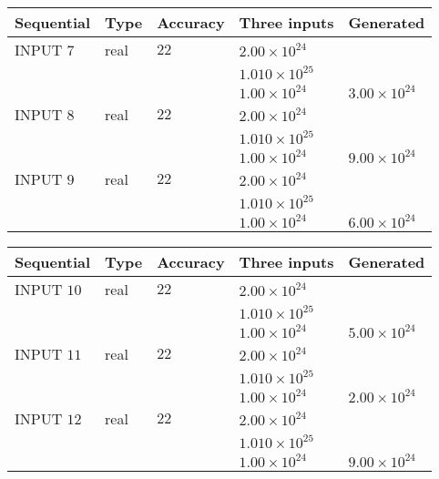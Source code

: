 \documentclass[12pt]{article}
\begin{document}
   
  
  
\noindent\begin{tabular}{|l|l|l|l|l|}
\hline
 Sequential & Type & Accuracy & Three inputs & Generated \\ 
\hline
 
 
  INPUT $            7 $ & real & $           22  $ & $
 2.00 \times 10^{24}
  $ & \\
  & & &  $
 1.010 \times 10^{25}
  $ & \\
  & & &  $
 1.00 \times 10^{24}
 $ & $ 3.00 \times 10^{24} $ 
 \\  \hline  
 
 
  INPUT $            8 $ & real & $           22  $ & $
 2.00 \times 10^{24}
  $ & \\
  & & &  $
 1.010 \times 10^{25}
  $ & \\
  & & &  $
 1.00 \times 10^{24}
 $ & $ 9.00 \times 10^{24} $ 
 \\  \hline  
 
 
  INPUT $            9 $ & real & $           22  $ & $
 2.00 \times 10^{24}
  $ & \\
  & & &  $
 1.010 \times 10^{25}
  $ & \\
  & & &  $
 1.00 \times 10^{24}
 $ & $ 6.00 \times 10^{24} $ 
 \\  \hline  
 \end{tabular}
   
   
  
  
\noindent\begin{tabular}{|l|l|l|l|l|}
\hline
 Sequential & Type & Accuracy & Three inputs & Generated \\ 
\hline
 
 
  INPUT $           10 $ & real & $           22  $ & $
 2.00 \times 10^{24}
  $ & \\
  & & &  $
 1.010 \times 10^{25}
  $ & \\
  & & &  $
 1.00 \times 10^{24}
 $ & $ 5.00 \times 10^{24} $ 
 \\  \hline  
 
 
  INPUT $           11 $ & real & $           22  $ & $
 2.00 \times 10^{24}
  $ & \\
  & & &  $
 1.010 \times 10^{25}
  $ & \\
  & & &  $
 1.00 \times 10^{24}
 $ & $ 2.00 \times 10^{24} $ 
 \\  \hline  
 
 
  INPUT $           12 $ & real & $           22  $ & $
 2.00 \times 10^{24}
  $ & \\
  & & &  $
 1.010 \times 10^{25}
  $ & \\
  & & &  $
 1.00 \times 10^{24}
 $ & $ 9.00 \times 10^{24} $ 
 \\  \hline  
 \end{tabular}
   
\end{document}
